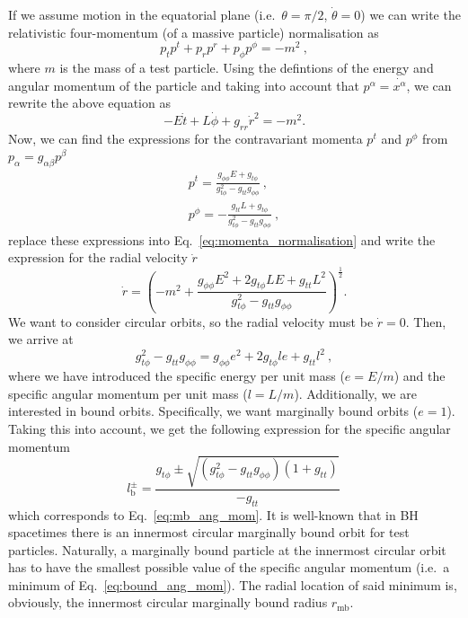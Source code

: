 \documentclass[twocolumn,aps,showpacs,showkeys,prd,superscriptaddress,byrevtex, amsmath]{revtex4-1}
\begin{document}
\begin{appendix}
If we assume motion in the equatorial plane (i.e.~$\theta = \pi/2$, $\dot{\theta} = 0$) we can write the relativistic four-momentum (of a massive particle) normalisation as
\begin{equation}\label{eq:momenta_normalisation}
p_{t}p^t + p_{r}p^r + p_{\phi}p^{\phi} = -m^2\ ,
\end{equation}
where $m$ is the mass of a test particle. Using the defintions of the energy and angular momentum of the particle and taking into account that $p^{\alpha} = \dot{x^{\alpha}}$, we can rewrite the above equation as
\begin{equation}
-E \dot{t} + L \dot{\phi} + g_{rr} \dot{r}^2 = -m^2.
\end{equation}
Now, we can find the expressions for the contravariant momenta $p^{t}$ and $p^{\phi}$ from $p_{\alpha} = g_{\alpha \beta}p^{\beta}$
\begin{eqnarray}
p^{t} = \frac{g_{\phi\phi}E + g_{t\phi}}{g_{t\phi}^2-g_{tt}g_{\phi\phi}} \ ,
\\
p^{\phi} = -\frac{g_{tt}L+g_{t\phi}}{g_{t\phi}^2-g_{tt}g_{\phi\phi}}\ ,
\end{eqnarray}
replace these expressions into Eq.~\eqref{eq:momenta_normalisation} and write the expression for the radial velocity $\dot{r}$
\begin{equation}\label{eq:radial_velocity}
\dot{r} = \left(-m^2+\frac{g_{\phi\phi}E^2+2 g_{t\phi}LE+g_{tt}L^2}{g_{t\phi}^2-g_{tt}g_{\phi\phi}}\right)^{\frac{1}{2}}.
\end{equation}
We want to consider circular orbits, so the radial velocity must be $\dot{r} = 0$. Then, we arrive at
\begin{equation}
g_{t\phi}^2-g_{tt}g_{\phi\phi} = g_{\phi\phi}e^2+2 g_{t\phi}le+g_{tt}l^2\ ,
\end{equation}
where we have introduced the specific energy per unit mass ($e = E/m$) and the specific angular momentum per unit mass ($l = L/m$). Additionally, we are interested in bound orbits. Specifically, we want marginally bound orbits ($e=1$). Taking this into account, we get the following expression for the specific angular momentum
\begin{equation}\label{eq:bound_ang_mom}
l^{\pm}_{\mathrm{b}} = \frac{g_{t\phi} \pm \sqrt{ (g_{t\phi}^2-g_{tt}g_{\phi\phi})  (1+g_{tt}) } }{-g_{tt}}\,
\end{equation}
which corresponds to Eq.~\eqref{eq:mb_ang_mom}. It is well-known that in BH spacetimes there is an innermost circular marginally bound orbit for test particles. Naturally, a marginally bound particle at the innermost circular orbit has to have the smallest possible value of the specific angular momentum (i.e.~a minimum of Eq.~\eqref{eq:bound_ang_mom}). The radial location of said minimum is, obviously, the innermost circular marginally bound radius $r_{\mathrm{mb}}$.
\end{appendix}



\end{document}
